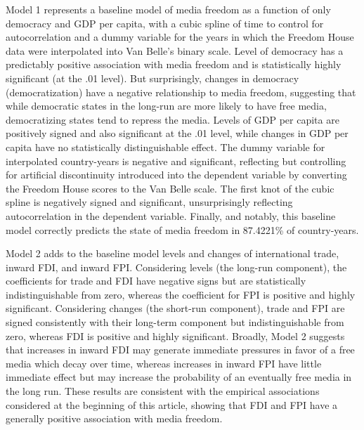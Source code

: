\documentclass[12pt,a4paper]{article}\usepackage[]{graphicx}\usepackage[]{color}
\begin{document}
Model 1 represents a baseline model of media freedom as a function of only democracy and GDP per capita, with a cubic spline of time to control for autocorrelation \parencite{Beck:1998wg} and a dummy variable for the years in which the Freedom House data were interpolated into Van Belle's binary scale. Level of democracy has a predictably positive association with media freedom and is statistically highly significant (at the .01 level). But surprisingly, changes in democracy (democratization) have a negative relationship to media freedom, suggesting that while democratic states in the long-run are more likely to have free media, democratizing states tend to repress the media. Levels of GDP per capita are positively signed and also significant at the .01 level, while changes in GDP per capita have no statistically distinguishable effect. The dummy variable for interpolated country-years is negative and significant, reflecting but controlling for artificial discontinuity introduced into the dependent variable by converting the Freedom House scores to the Van Belle scale. The first knot of the cubic spline is negatively signed and significant, unsurprisingly reflecting autocorrelation in the dependent variable. Finally, and notably, this baseline model correctly predicts the state of media freedom in 87.4221\% of country-years.

Model 2 adds to the baseline model levels and changes of international trade, inward FDI, and inward FPI. Considering levels (the long-run component), the coefficients for trade and FDI have negative signs but are statistically indistinguishable from zero, whereas the coefficient for FPI is positive and highly significant. Considering changes (the short-run component), trade and FPI are signed consistently with their long-term component but indistinguishable from zero, whereas FDI is positive and highly significant. Broadly, Model 2 suggests that increases in inward FDI may generate immediate pressures in favor of a free media which decay over time, whereas increases in inward FPI have little immediate effect but may increase the probability of an eventually free media in the long run. These results are consistent with the empirical associations considered at the beginning of this article, showing that FDI and FPI have a generally positive association with media freedom.
\end{document}
